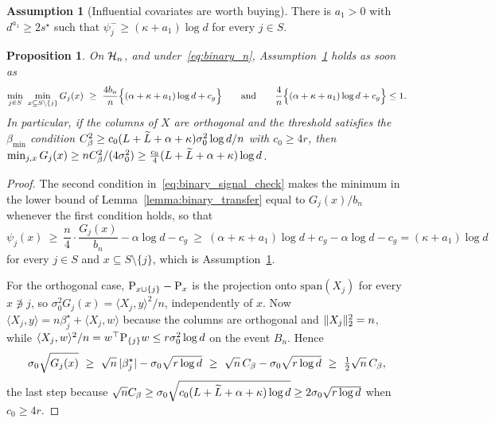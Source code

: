 \documentclass[aos]{imsart}%
\DeclarePairedDelimiter{\norm}{\lVert}{\rVert}
\DeclarePairedDelimiter{\abs}{\lvert}{\rvert}
\theoremstyle{plain}
\newtheorem{proposition}{Proposition}[section]
\theoremstyle{definition}
\newtheorem{assumption}[theorem]{Assumption}
\begin{document}
    \begin{assumption}[Influential covariates are worth buying]
        \label{ass:binary_signal}
        There is $a_1>0$ with $d^{a_1}\geq2s^{\star}$ such that
        $\psi_j^{-}\geq(\kappa+a_1)\log d$ for every $j\in S$.
    \end{assumption}

    \begin{proposition}
        \label{prop:binary_signal_check}
        On $\mathcal{H}_n$, and under~\eqref{eq:binary_n},
        Assumption~\ref{ass:binary_signal} holds as soon as
        \begin{equation}
            \label{eq:binary_signal_check}
            \min_{j\in S}\ \min_{x\subseteq S\setminus\{j\}}G_j(x)
            \ \geq\ \frac{4b_n}{n}\Bigl\{(\alpha+\kappa+a_1)\log d+c_g\Bigr\}
            \qquad\text{and}\qquad
            \frac{4}{n}\Bigl\{(\alpha+\kappa+a_1)\log d+c_g\Bigr\}\leq1 .
        \end{equation}
        In particular, if the columns of $X$ are orthogonal and the threshold
        satisfies the $\beta_{\min}$ condition
        $C_\beta^{2}\geq c_0(L+\widetilde{L}+\alpha+\kappa)\sigma_0^{2}\log d/n$ with
        $c_0\geq4r$, then
        $\min_{j,x}G_j(x)\geq nC_\beta^{2}/(4\sigma_0^{2})
        \geq\tfrac{c_0}{4}(L+\widetilde{L}+\alpha+\kappa)\log d$.
    \end{proposition}

    \begin{proof}
        The second condition in~\eqref{eq:binary_signal_check} makes the
        minimum in the lower bound of Lemma~\ref{lemma:binary_transfer} equal
        to $G_j(x)/b_n$ whenever the first condition holds, so that
        \begin{equation*}
            \psi_j(x)\ \geq\ \frac{n}{4}\cdot\frac{G_j(x)}{b_n}
            -\alpha\log d-c_g
            \ \geq\ (\alpha+\kappa+a_1)\log d+c_g-\alpha\log d-c_g
            =(\kappa+a_1)\log d
        \end{equation*}
        for every $j\in S$ and $x\subseteq S\setminus\{j\}$, which is
        Assumption~\ref{ass:binary_signal}.

        For the orthogonal case, $\mathrm{P}_{x\cup\{j\}}-\mathrm{P}_x$ is the projection
        onto $\mathrm{span}(X_j)$ for every $x\not\ni j$, so
        $\sigma_0^{2}G_j(x)=\langle X_j,y\rangle^{2}/n$, independently of $x$.
        Now $\langle X_j,y\rangle=n\beta^\star_j+\langle X_j,w\rangle$ because
        the columns are orthogonal and $\norm{X_j}_2^{2}=n$, while
        $\langle X_j,w\rangle^{2}/n=w^{\top}\mathrm{P}_{\{j\}}w\leq r\sigma_0^{2}
        \log d$ on the event $B_n$. Hence
        \begin{equation*}
            \sigma_0\sqrt{G_j(x)}\ \geq\ \sqrt n\,\abs{\beta^\star_j}
            -\sigma_0\sqrt{r\log d}
            \ \geq\ \sqrt n\,C_\beta-\sigma_0\sqrt{r\log d}
            \ \geq\ \tfrac12\sqrt n\,C_\beta,
        \end{equation*}
        the last step because $\sqrt nC_\beta\geq
        \sigma_0\sqrt{c_0(L+\widetilde{L}+\alpha+\kappa)\log d}
        \geq2\sigma_0\sqrt{r\log d}$ when $c_0\geq4r$.
    \end{proof}
\end{document}
